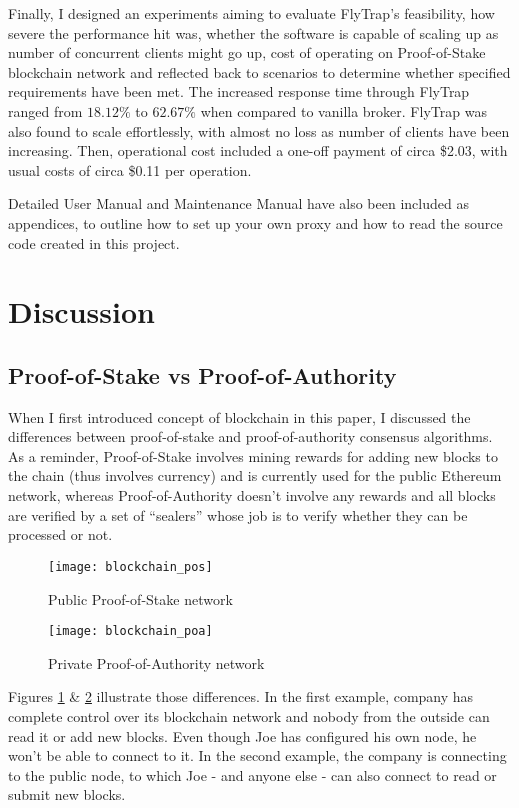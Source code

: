 Finally, I designed an experiments aiming to evaluate FlyTrap's feasibility, how severe the performance hit was, whether the software is capable of scaling up as number of concurrent clients might go up, cost of operating on Proof-of-Stake blockchain network and reflected back to scenarios to determine whether specified requirements have been met. The increased response time through FlyTrap ranged from $18.12\%$ to $62.67\%$ when compared to vanilla broker. FlyTrap was also found to scale effortlessly, with almost no loss as number of clients have been increasing. Then, operational cost included a one-off payment of circa \$2.03, with usual costs of circa \$0.11 per operation.

Detailed User Manual and Maintenance Manual have also been included as appendices, to outline how to set up your own proxy and how to read the source code created in this project.

\section{Discussion}

\subsection{Proof-of-Stake vs Proof-of-Authority}
When I first introduced concept of blockchain in this paper, I discussed the differences between proof-of-stake and proof-of-authority consensus algorithms. As a reminder, Proof-of-Stake involves mining rewards for adding new blocks to the chain (thus involves currency) and is currently used for the public Ethereum network, whereas Proof-of-Authority doesn't involve any rewards and all blocks are verified by a set of ``sealers'' whose job is to verify whether they can be processed or not.

\begin{figure}[h]
    \centering
    \texttt{[image: blockchain\_pos]}
    \caption{Public Proof-of-Stake network}
    \label{fig:blockchain_pos}
\end{figure}
\begin{figure}[h]
    \centering
    \texttt{[image: blockchain\_poa]}
    \caption{Private Proof-of-Authority network}
    \label{fig:blockchain_poa}
\end{figure}

Figures \ref{fig:blockchain_pos} \& \ref{fig:blockchain_poa} illustrate those differences. In the first example, company has complete control over its blockchain network and nobody from the outside can read it or add new blocks. Even though Joe has configured his own node, he won't be able to connect to it. In the second example, the company is connecting to the public node, to which Joe - and anyone else - can also connect to read or submit new blocks.

